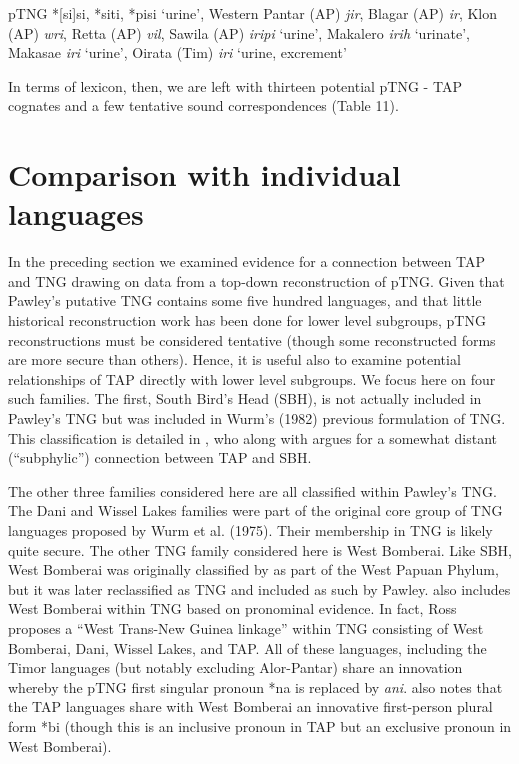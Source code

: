 \ea%
   pTNG *[si]si, *siti, *pisi `urine', Western Pantar (AP) \textit{jir}, Blagar (AP) \textit{ir}, Klon (AP) \textit{wri}, Retta (AP) \textit{vil}, Sawila (AP) \textit{iripi{\ng}} `urine', Makalero \textit{irih }`urinate', Makasae \textit{iri }`urine', Oirata (Tim) \textit{iri} `urine, excrement'
\z

In terms of lexicon, then, we are left with thirteen potential pTNG - TAP cognates and a few tentative sound correspondences (Table 11).

\section{Comparison with individual languages}
In the preceding section we examined evidence for a connection between TAP and TNG drawing on data from a top-down reconstruction of pTNG. Given that Pawley's putative TNG contains some five hundred languages, and that little historical reconstruction work has been done for lower level subgroups, pTNG reconstructions must be considered tentative (though some reconstructed forms are more secure than others). Hence, it is useful also to examine potential relationships of TAP directly with lower level subgroups. We focus here on four such families. The first, South Bird's Head (SBH), is not actually included in Pawley's TNG but was included in Wurm's (1982) previous formulation of TNG. This classification is detailed in \citet{Voorhoeve1975}, who along with \citet{Stokhof1975} argues for a somewhat distant (``subphylic'') connection between TAP and SBH. \nocite{Wurm1982}

The other three families considered here are all classified within Pawley's TNG. The Dani and Wissel Lakes families were part of the original core group of TNG languages proposed by Wurm et al. (1975). Their membership in TNG is likely quite secure. The other TNG family considered here is West Bomberai. Like SBH, West Bomberai was originally classified by \citet{Cowan1957} as part of the West Papuan Phylum, but it was later reclassified as TNG and included as such by Pawley. \citet{Ross2005} also includes West Bomberai within TNG based on pronominal evidence. In fact, Ross proposes a ``West Trans-New Guinea linkage'' within TNG consisting of West Bomberai, Dani, Wissel Lakes, and TAP. All of these languages, including the Timor languages (but notably excluding Alor-Pantar) share an innovation whereby the pTNG first singular pronoun *na is replaced by \textit{ani}. \citet[37]{Ross2005} also notes that the TAP languages share with West Bomberai an innovative first-person plural form *bi (though this is an inclusive
pronoun in TAP but an exclusive pronoun in West Bomberai).

